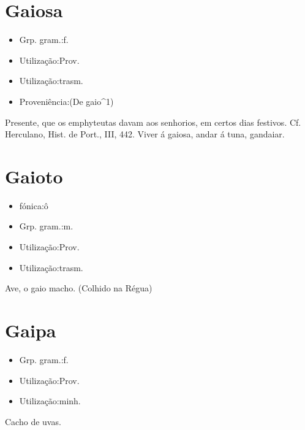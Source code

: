 \section{Gaiosa}
\begin{itemize}
\item {Grp. gram.:f.}
\end{itemize}
\begin{itemize}
\item {Utilização:Prov.}
\end{itemize}
\begin{itemize}
\item {Utilização:trasm.}
\end{itemize}
\begin{itemize}
\item {Proveniência:(De \textunderscore gaio\textunderscore ^1)}
\end{itemize}
Presente, que os emphyteutas davam aos senhorios, em certos dias festivos. Cf. Herculano, \textunderscore Hist. de Port.\textunderscore , III, 442.
\textunderscore Viver á gaiosa\textunderscore , andar á tuna, gandaiar.
\section{Gaioto}
\begin{itemize}
\item {fónica:ô}
\end{itemize}
\begin{itemize}
\item {Grp. gram.:m.}
\end{itemize}
\begin{itemize}
\item {Utilização:Prov.}
\end{itemize}
\begin{itemize}
\item {Utilização:trasm.}
\end{itemize}
Ave, o gaio macho. (Colhido na Régua)
\section{Gaipa}
\begin{itemize}
\item {Grp. gram.:f.}
\end{itemize}
\begin{itemize}
\item {Utilização:Prov.}
\end{itemize}
\begin{itemize}
\item {Utilização:minh.}
\end{itemize}
Cacho de uvas.
